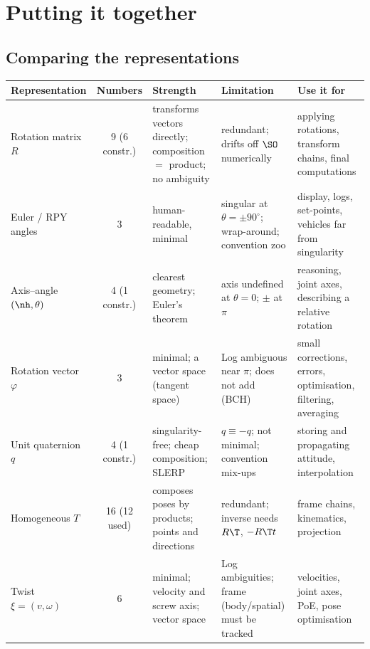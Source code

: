 \section{Putting it together}\label{sec:rot:summary}

\subsection{Comparing the representations}\label{sec:rot:comparing-representations}
\begin{center}\small
\renewcommand{\arraystretch}{1.15}
\begin{tabularx}{\linewidth}{@{}l c >{\raggedright\arraybackslash}X >{\raggedright\arraybackslash}X >{\raggedright\arraybackslash}X@{}}\toprule
Representation & Numbers & Strength & Limitation & Use it for\\\midrule
Rotation matrix $R$ & 9 (6 constr.) & transforms vectors directly; composition $=$ product; no ambiguity & redundant; drifts off $\SO$ numerically & applying rotations, transform chains, final computations\\
Euler / RPY angles & 3 & human-readable, minimal & singular at $\theta=\pm90^\circ$; wrap-around; convention zoo & display, logs, set-points, vehicles far from singularity\\
Axis--angle $(\nh,\theta)$ & 4 (1 constr.) & clearest geometry; Euler's theorem & axis undefined at $\theta=0$; $\pm$ at $\pi$ & reasoning, joint axes, describing a relative rotation\\
Rotation vector $\varphi$ & 3 & minimal; a vector space (tangent space) & Log ambiguous near $\pi$; does not add (BCH) & small corrections, errors, optimisation, filtering, averaging\\
Unit quaternion $q$ & 4 (1 constr.) & singularity-free; cheap composition; SLERP & $q\equiv-q$; not minimal; convention mix-ups & storing and propagating attitude, interpolation\\
Homogeneous $T$ & 16 (12 used) & composes poses by products; points and directions & redundant; inverse needs $R\T$, $-R\T t$ & frame chains, kinematics, projection\\
Twist $\xi=(v,\omega)$ & 6 & minimal; velocity and screw axis; vector space & Log ambiguities; frame (body/spatial) must be tracked & velocities, joint axes, PoE, pose optimisation\\\bottomrule
\end{tabularx}
\end{center}

